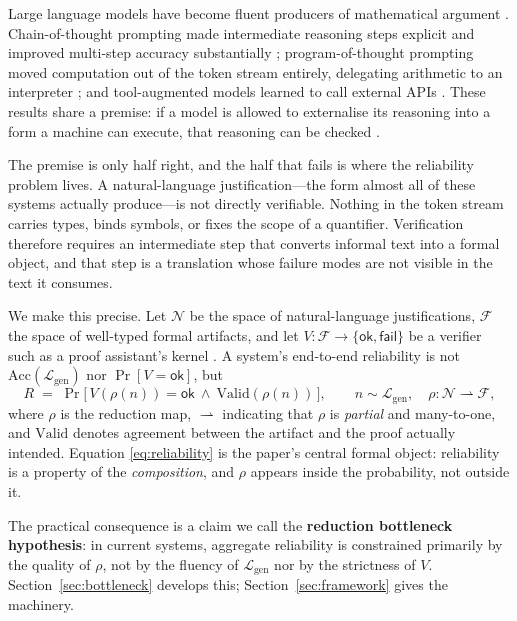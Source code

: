 \documentclass[11pt,a4paper]{article}
\theoremstyle{plain}
\theoremstyle{definition}
\newcommand{\OK}{\ensuremath{\mathsf{ok}}}      %
\newcommand{\FAIL}{\ensuremath{\mathsf{fail}}}
\newcommand{\LayerG}{\mathcal{L}_{\mathrm{gen}}}
\begin{document}
Large language models have become fluent producers of mathematical
argument \citep{brown2020}. Chain-of-thought prompting made intermediate
reasoning steps explicit and improved multi-step accuracy substantially
\citep{wei2022cot}; program-of-thought prompting moved computation out of
the token stream entirely, delegating arithmetic to an interpreter
\citep{chen2022pot}; and tool-augmented models learned to call external
APIs \citep{schick2023toolformer}. These results share a premise: if a
model is allowed to externalise its reasoning into a form a machine can
execute, that reasoning can be checked \citep{alphageometry2024}.

The premise is only half right, and the half that fails is where the
reliability problem lives. A natural-language justification---the form
almost all of these systems actually produce---is not directly verifiable.
Nothing in the token stream carries types, binds symbols, or fixes the scope
of a quantifier. Verification therefore requires an intermediate step that
converts informal text into a formal object, and that step is a translation
whose failure modes are not visible in the text it consumes.

We make this precise. Let $\mathcal{N}$ be the space of natural-language
justifications, $\mathcal{F}$ the space of well-typed formal artifacts, and
let $V\colon\mathcal{F}\to\{\OK,\FAIL\}$ be a verifier such
as a proof assistant's kernel \citep{lean4tool,isabelle2002,coqmanual}. A
system's end-to-end reliability is not $\mathrm{Acc}(\LayerG)$ nor
$\Pr[V=\OK]$, but
\begin{equation}
\label{eq:reliability}
R \;=\; \Pr\!\big[\,V(\rho(n))=\OK\ \wedge\ \mathrm{Valid}(\rho(n))\,\big],
\qquad
n\sim\LayerG,\quad \rho\colon\mathcal{N}\rightharpoonup\mathcal{F},
\end{equation}
where $\rho$ is the reduction map, $\rightharpoonup$ indicating that $\rho$
is \emph{partial} and many-to-one, and $\mathrm{Valid}$ denotes agreement
between the artifact and the proof actually intended. Equation
\eqref{eq:reliability} is the paper's central formal object: reliability is
a property of the \emph{composition}, and $\rho$ appears inside the
probability, not outside it.

The practical consequence is a claim we call the \textbf{reduction
bottleneck hypothesis}: in current systems, aggregate reliability is
constrained primarily by the quality of $\rho$, not by the fluency of
$\LayerG$ nor by the strictness of $V$. Section~\ref{sec:bottleneck}
develops this; Section~\ref{sec:framework} gives the machinery.
\end{document}
